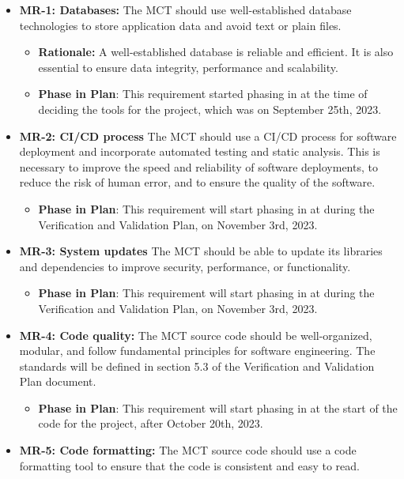 \documentclass[12pt]{article}
\begin{document}
\begin{itemize}
    \item \textbf{MR-1: Databases: }The MCT should use well-established database technologies to store application data and avoid text or plain files.
    \begin{itemize}
        \item \textbf{Rationale: }A well-established database is reliable and efficient. It is also essential to ensure data integrity, performance and scalability.
        \item \textbf{Phase in Plan}: This requirement started phasing in at the time of deciding the tools for the project, which was on September 25th, 2023.
    \end{itemize}
    \item \textbf{MR-2: CI/CD process} The MCT should use a CI/CD process for software deployment and incorporate automated testing and static analysis. This is necessary to improve the speed and reliability of software deployments, to reduce the risk of human error, and to ensure the quality of the software.
    \begin{itemize}
        \item \textbf{Phase in Plan}: This requirement will start phasing in at during the Verification and Validation Plan, on November 3rd, 2023.
    \end{itemize}
    \item \textbf{MR-3: System updates} The MCT should be able to update its libraries and dependencies to improve security, performance, or functionality.
    \begin{itemize}
        \item \textbf{Phase in Plan}: This requirement will start phasing in at during the Verification and Validation Plan, on November 3rd, 2023.
    \end{itemize}
    \item \textbf{MR-4: Code quality:} The MCT source code should be well-organized, modular, and follow fundamental principles for software engineering. The standards will be defined in section 5.3 of the Verification and Validation Plan document.
    \begin{itemize}
        \item \textbf{Phase in Plan}: This requirement will start phasing in at the start of the code for the project, after October 20th, 2023.
    \end{itemize}
    \item \textbf{MR-5: Code formatting:} The MCT source code should use a code formatting tool to ensure that the code is consistent and easy to read.

\end{itemize}
\end{document}

